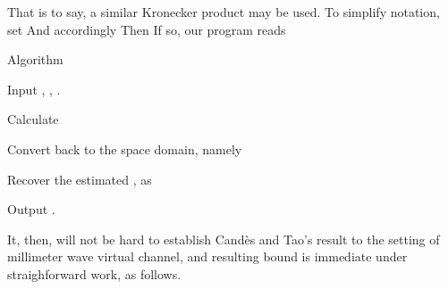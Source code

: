 That is to say, a similar Kronecker product may be used.
To simplify notation, set
And accordingly
Then
If so, our program reads

\Result
{Algorithm}
{
\startitemize[n]
\item Input , , .
\item Calculate
\item Convert  back to the space domain, namely
\item Recover the estimated , as
\item Output .
\stopitemize
}

It, then, will not be hard to establish Cand\`es and Tao's result to the setting of millimeter wave virtual channel, and resulting bound is immediate under straighforward work, as follows.

\stopsubsection
\stopsection

\stopchapter
